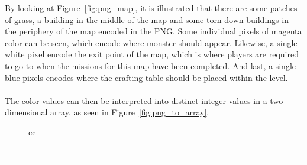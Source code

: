 By looking at Figure~\ref{fig:png_map}, it is illustrated that there are some
patches of grass, a building in the middle of the map and some torn-down
buildings in the periphery of the map encoded in the PNG.  Some individual
pixels of magenta color can be seen, which encode where monster should appear.
Likewise, a single white pixel encode the exit point of the map, which is where
players are required to go to when the missions for this map have been
completed.  And last, a single blue pixels encodes where the crafting table
should be placed within the level.
\\\\
The color values can then be interpreted into distinct integer values in a
two-dimensional array, as seen in Figure~\ref{fig:png_to_array}.
\begin{figure}[H]
    \centering
    \begin{tabular}{cc}
        {\footnotesize
            \setlength{\tabcolsep}{4.5pt}
            \begin{tabular}{|c|c|c|c|c|c|c|c|c|c|}
                \hline
                \cellcolor{black} & \cellcolor{black} & \cellcolor{black} &
                \cellcolor{black} & \cellcolor{black} & \cellcolor{red} &
                \cellcolor{red} & \cellcolor{red} & \cellcolor{red} &
                \cellcolor{red} \\ \hline
                \cellcolor{green} & \cellcolor{green} & \cellcolor{black} &
                \cellcolor{black} & \cellcolor{black} & \cellcolor{yellow} &
                \cellcolor{red} & \cellcolor{red} & \cellcolor{red} &
                \cellcolor{red} \\ \hline
                \cellcolor{green} & \cellcolor{green} & \cellcolor{green} &
                \cellcolor{black} & \cellcolor{black} & \cellcolor{yellow} &
                \cellcolor{red} & \cellcolor{red} & \cellcolor{red} &
                \cellcolor{red} \\ \hline
                \cellcolor{green} & \cellcolor{green} & \cellcolor{green} &
                \cellcolor{black} & \cellcolor{black} & \cellcolor{yellow} &
                \cellcolor{red} & \cellcolor{red} & \cellcolor{red} &
                \cellcolor{red} \\ \hline
                \cellcolor{green} & \cellcolor{green} & \cellcolor{green} &
                \cellcolor{black} & \cellcolor{black} & \cellcolor{yellow} &
                \cellcolor{yellow} & \cellcolor{red} & \cellcolor{red} &
                \cellcolor{yellow} \\ \hline

\end{tabular}}
\end{tabular}
\end{figure}
